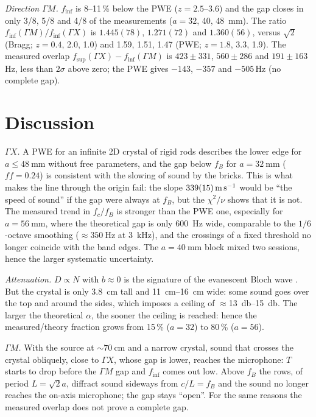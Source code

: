 \documentclass[9pt,a4paper,twocolumn]{extarticle}
\newcommand{\umm}{\milli\metre}
\newcommand{\ucm}{\centi\metre}
\newcommand{\uHz}{\hertz}
\newcommand{\ukHz}{\kilo\hertz}
\newcommand{\udB}{\decibel}
\newcommand{\ums}{\metre\per\second}
\newcommand{\GX}{\ensuremath{\Gamma X}}
\newcommand{\GM}{\ensuremath{\Gamma M}}
\newcommand{\finf}{\ensuremath{f_{\mathrm{inf}}}}
\newcommand{\fsup}{\ensuremath{f_{\mathrm{sup}}}}
\begin{document}
\emph{Direction \GM.} \finf{} is 8--11\,\% below the PWE ($z=2.5$--$3.6$) and the gap closes in only 3/8, 5/8 and 4/8 of the measurements ($a=32$, 40, \SI{48}{\umm}). The ratio $\finf(\GM)/\finf(\GX)$ is $1.445(78)$, $1.271(72)$ and $1.360(56)$, versus $\sqrt2$ (Bragg; $z=0.4$, 2.0, 1.0) and 1.59, 1.51, 1.47 (PWE; $z=1.8$, 3.3, 1.9). The measured overlap $\fsup(\GX)-\finf(\GM)$ is $423\pm331$, $560\pm286$ and $191\pm163$\,Hz, less than $2\sigma$ above zero; the PWE gives $-143$, $-357$ and $-505$\,Hz (no complete gap).

\section{Discussion}
\emph{\GX.} A PWE for an infinite 2D crystal of rigid rods describes the lower edge for $a\le\SI{48}{\umm}$ without free parameters, and the gap below $f_B$ for $a=\SI{32}{\umm}$ ($ff=0.24$) is consistent with the slowing of sound by the bricks. This is what makes the line through the origin fail: the slope $\SI{339\pm15}{\ums}$ would be ``the speed of sound'' if the gap were always at $f_B$, but the $\chi^2/\nu$ shows that it is not. The measured trend in $f_c/f_B$ is stronger than the PWE one, especially for $a=\SI{56}{\umm}$, where the theoretical gap is only \SI{600}{\uHz} wide, comparable to the $1/6$-octave smoothing ($\approx\SI{350}{\uHz}$ at \SI{3}{\ukHz}), and the crossings of a fixed threshold no longer coincide with the band edges. The $a=\SI{40}{\umm}$ block mixed two sessions, hence the larger systematic uncertainty.

\emph{Attenuation.} $D\propto N$ with $b\approx0$ is the signature of the evanescent Bloch wave \cite{sanchez}. But the crystal is only \SI{3.8}{\ucm} tall and \SIrange{11}{16}{\ucm} wide: some sound goes over the top and around the sides, which imposes a ceiling of $\approx$\SIrange{13}{15}{\udB}. The larger the theoretical $\alpha$, the sooner the ceiling is reached: hence the measured/theory fraction grows from 15\,\% ($a=32$) to 80\,\% ($a=56$).

\emph{\GM.} With the source at $\sim\SI{70}{\ucm}$ and a narrow crystal, sound that crosses the crystal obliquely, close to \GX, whose gap is lower, reaches the microphone: $T$ starts to drop before the \GM{} gap and \finf{} comes out low. Above $f_B$ the rows, of period $L=\sqrt2a$, diffract sound sideways from $c/L=f_B$ and the sound no longer reaches the on-axis microphone; the gap stays ``open''. For the same reasons the measured overlap does not prove a complete gap.
\end{document}

